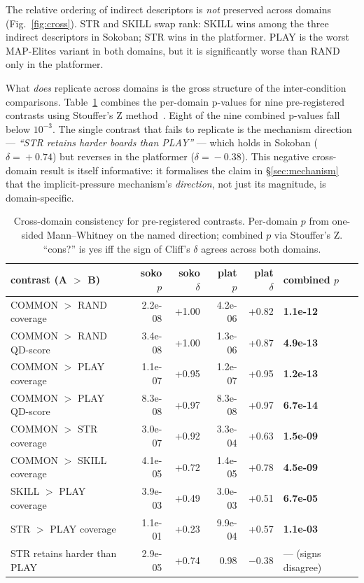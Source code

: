 \documentclass[conference]{IEEEtran}
\begin{document}
The relative ordering of indirect descriptors is \emph{not}
preserved across domains (Fig.~\ref{fig:cross}). \textsf{STR} and
\textsf{SKILL} swap rank: \textsf{SKILL} wins among the three
indirect descriptors in Sokoban; \textsf{STR} wins in the
platformer. \textsf{PLAY} is the worst MAP-Elites variant in both
domains, but it is significantly worse than \textsf{RAND} only in
the platformer.

What \emph{does} replicate across domains is the gross structure
of the inter-condition comparisons. Table~\ref{tab:crossdomain}
combines the per-domain p-values for nine pre-registered
contrasts using Stouffer's Z method~\cite{stouffer1949combining}.
Eight of the nine combined p-values fall below
$10^{-3}$. The single contrast that fails to replicate is the
mechanism direction --- \emph{``\textsf{STR} retains harder
boards than \textsf{PLAY}''} --- which holds in Sokoban
($\delta\!=\!+0.74$) but reverses in the platformer
($\delta\!=\!-0.38$). This negative cross-domain result is itself
informative: it formalises the claim in
\S\ref{sec:mechanism} that the implicit-pressure mechanism's
\emph{direction}, not just its magnitude, is domain-specific.

\begin{table}[t]
  \centering
  \caption{Cross-domain consistency for pre-registered contrasts.
  Per-domain $p$ from one-sided Mann--Whitney on the named direction;
  combined $p$ via Stouffer's Z. ``cons?'' is yes iff the sign of
  Cliff's $\delta$ agrees across both domains.}
  \label{tab:crossdomain}
  \scriptsize
  \setlength{\tabcolsep}{3pt}
  \begin{tabular}{lrrrrl}
    \toprule
    contrast (\textbf{A} $>$ \textbf{B}) & soko $p$ & soko $\delta$ & plat $p$ & plat $\delta$ & combined $p$ \\
    \midrule
    COMMON $>$ RAND coverage        & 2.2e-08 & +1.00 & 4.2e-06 & +0.82 & \textbf{1.1e-12} \\
    COMMON $>$ RAND QD-score        & 3.4e-08 & +1.00 & 1.3e-06 & +0.87 & \textbf{4.9e-13} \\
    COMMON $>$ PLAY coverage        & 1.1e-07 & +0.95 & 1.2e-07 & +0.95 & \textbf{1.2e-13} \\
    COMMON $>$ PLAY QD-score        & 8.3e-08 & +0.97 & 8.3e-08 & +0.97 & \textbf{6.7e-14} \\
    COMMON $>$ STR    coverage      & 3.0e-07 & +0.92 & 3.3e-04 & +0.63 & \textbf{1.5e-09} \\
    COMMON $>$ SKILL  coverage      & 4.1e-05 & +0.72 & 1.4e-05 & +0.78 & \textbf{4.5e-09} \\
    SKILL  $>$ PLAY   coverage      & 3.9e-03 & +0.49 & 3.0e-03 & +0.51 & \textbf{6.7e-05} \\
    STR    $>$ PLAY   coverage      & 1.1e-01 & +0.23 & 9.9e-04 & +0.57 & \textbf{1.1e-03} \\
    \midrule
    STR retains harder than PLAY    & 2.9e-05 & +0.74 & 0.98 & $-0.38$ & --- (signs disagree) \\
    \bottomrule
  \end{tabular}
\end{table}
\end{document}
